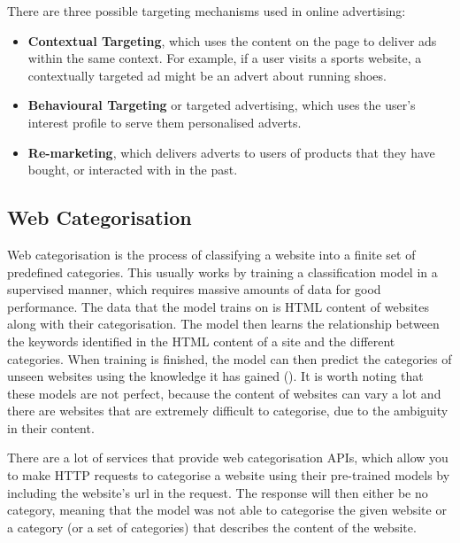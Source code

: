 \documentclass{l4proj}
\begin{document}
There are three possible targeting mechanisms used in online advertising:
\begin{itemize}
    \item \textbf{Contextual Targeting}, which uses the content on the page to deliver ads within the same context. For example, if a user visits a sports website, a contextually targeted ad might be an advert about running shoes.
    \item \textbf{Behavioural Targeting} or targeted advertising, which uses the user's interest profile to serve them personalised adverts.
    \item \textbf{Re-marketing}, which delivers adverts to users of products that they have bought, or interacted with in the past.
\end{itemize}


\subsection{Web Categorisation}
Web categorisation is the process of classifying a website into a finite set of predefined categories. This usually works by training a classification model in a supervised manner, which requires massive amounts of data for good performance. The data that the model trains on is HTML content of websites along with their categorisation. The model then learns the relationship between the keywords identified in the HTML content of a site and the different categories. When training is finished, the model can then predict the categories of unseen websites using the knowledge it has gained (\cite{webcat}). It is worth noting that these models are not perfect, because the content of websites can vary a lot and there are websites that are extremely difficult to categorise, due to the ambiguity in their content. 

There are a lot of services that provide web categorisation APIs, which allow you to make HTTP requests to categorise a website using their pre-trained models by including the website's url in the request. The response will then either be no category, meaning that the model was not able to categorise the given website or a category (or a set of categories) that describes the content of the website.
\end{document}
